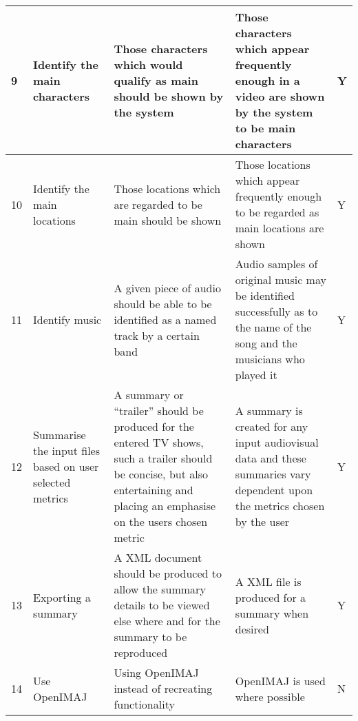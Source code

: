 \begin{center}
\begin{longtable}{| p{20pt} | p{105pt}| p{105pt} | p{105pt} | p{35pt} |}
9 & Identify the main characters & Those characters which would qualify as main
should be shown by the system & Those characters which appear frequently enough in a video are shown by the system to be main characters & Y\\\hline
10 & Identify the main locations & Those locations which are regarded to be main
should be shown & Those locations which appear frequently enough to be regarded
as main locations are shown & Y\\\hline
11 & Identify music & A given piece of audio should be able to be identified as
a named track by a certain band & Audio samples of original music may be
identified successfully as to the name of the song and the musicians who played
it & Y\\\hline
12 & Summarise the input files based on user selected metrics & A summary or
``trailer'' should be produced for the entered TV shows, such a trailer should
be concise, but also entertaining and placing an emphasise on the users chosen
metric & A summary is created for any input audiovisual data and these summaries
vary dependent upon the metrics chosen by the user & Y\\\hline
13 & Exporting a summary & A XML document should be produced to allow the
summary details to be viewed else where and for the summary to be reproduced &
A XML file is produced for a summary when desired & Y\\\hline
14 & Use OpenIMAJ & Using OpenIMAJ instead of recreating functionality & OpenIMAJ is used where possible & N
\\\hline
\end{longtable}
\end{center}